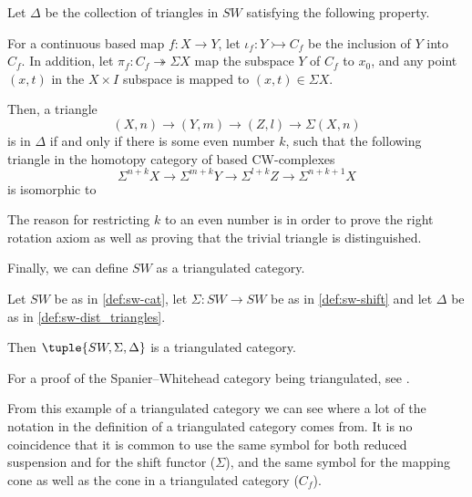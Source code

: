 \begin{definition}
    \label{def:sw-dist_triangles}
    Let \( \Delta \) be the collection of triangles in \( SW \) satisfying the following property.

    For a continuous based map \( f: X \to Y \), let \( \iota_f: Y \rightarrowtail C_f \) be the inclusion of \( Y \) into \( C_f \). In addition, let \( \pi_f: C_f \twoheadrightarrow \Sigma X \) map the subspace \( Y \) of \( C_f \) to \( x_0 \), and any point \( (x, t) \) in the \( X \times I \) subspace is mapped to \( (x, t) \in \Sigma X \).
    
    Then, a triangle
    \[
        (X, n) \to (Y, m) \to (Z, l) \to \Sigma (X, n)
    \]
    is in \( \Delta \) if and only if there is some even number \( k \), such that the following triangle in the homotopy category of based CW-complexes
    \[
        \Sigma^{n + k} X \to \Sigma^{m + k} Y \to \Sigma^{l + k} Z \to \Sigma^{n + k + 1} X
    \]
    is isomorphic to
    \begin{center}
    \end{center}
\end{definition}

The reason for restricting \( k \) to an even number is in order to prove the right rotation axiom as well as proving that the trivial triangle is distinguished.

Finally, we can define \( SW \) as a triangulated category.

\begin{example}
    Let \( SW \) be as in \autoref{def:sw-cat}, let \( \Sigma: SW \to SW \) be as in \autoref{def:sw-shift} and let \( \Delta \) be as in \autoref{def:sw-dist_triangles}.

    Then \( \tuple{SW, \Sigma, \Delta} \) is a triangulated category.
\end{example}

For a proof of the Spanier--Whitehead category being triangulated, see \cite[Theorem 5.9]{Daria_Bachelor}.

From this example of a triangulated category we can see where a lot of the notation in the definition of a triangulated category comes from. It is no coincidence that it is common to use the same symbol for both reduced suspension and for the shift functor (\( \Sigma \)), and the same symbol for the mapping cone as well as the cone in a triangulated category (\( C_f \)).
